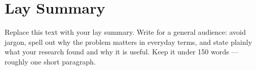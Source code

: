 

\chapter{Lay Summary}

Replace this text with your lay summary.  Write for a general
audience: avoid jargon, spell out why the problem matters in everyday
terms, and state plainly what your research found and why it is
useful.  Keep it under 150 words --- roughly one short paragraph.
